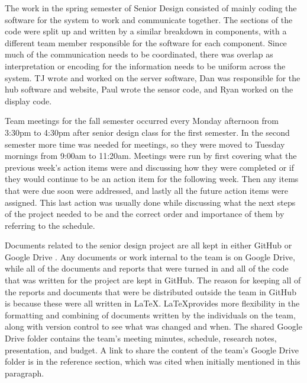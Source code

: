 \documentclass[PPFS.tex]{template/subfiles}
\begin{document}
	The work in the spring semester of Senior Design consisted of mainly coding the software for the system to work and communicate together. The sections of the code were split up and written by a similar breakdown in components, with a different team member responsible for the software for each component. Since much of the communication needs to be coordinated, there was overlap as interpretation or encoding for the information needs to be uniform across the system. TJ wrote and worked on the server software, Dan was responsible for the hub software and website, Paul wrote the sensor code, and Ryan worked on the display code.

	Team meetings for the fall semester occurred every Monday afternoon from 3:30pm to 4:30pm after senior design class for the first semester. In the second semester more time was needed for meetings, so they were moved to Tuesday mornings from 9:00am to 11:20am. Meetings were run by first covering what the previous week's action items were and discussing how they were completed or if they would continue to be an action item for the following week. Then any items that were due soon were addressed, and lastly all the future action items were assigned. This last action was usually done while discussing what the next steps of the project needed to be and the correct order and importance of them by referring to the schedule.

	Documents related to the senior design project are all kept in either GitHub or Google Drive \cite{Google Drive}. Any documents or work internal to the team is on Google Drive, while all of the documents and reports that were turned in and all of the code that was written for the project are kept in GitHub. The reason for keeping all of the reports and documents that were be distributed outside the team in GitHub is because these were all written in \LaTeX. \LaTeX provides more flexibility in the formatting and combining of documents written by the individuals on the team, along with version control to see what was changed and when. The shared Google Drive folder contains the team's meeting minutes, schedule, research notes, presentation, and budget. A link to share the content of the team's Google Drive folder is in the reference section, which was cited when initially mentioned in this paragraph.
	
\end{document}
